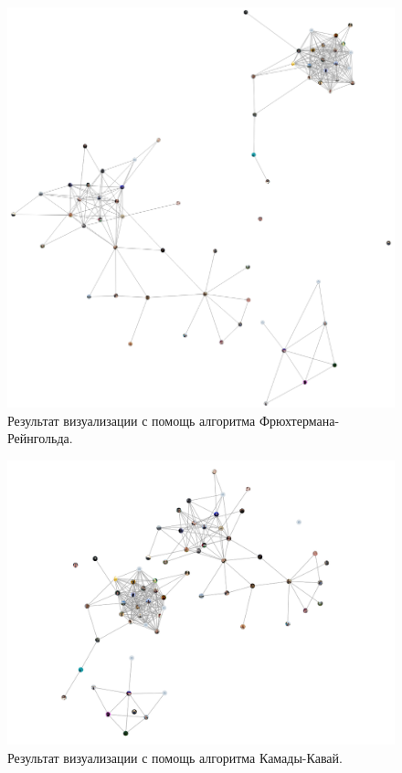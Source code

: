 \documentclass[14pt, russian]{scrartcl}
\begin{document}
\begin{figure}[H]
\centering
  \begin{minipage}[t]{.7\textwidth}
  \centering
\includegraphics[width=.7\textwidth]{./imgs/fr.png}
  \end{minipage}
\caption{Результат визуализации с помощь алгоритма Фрюхтермана-Рейнгольда.}
\label{fig:fr_result}
\end{figure}


\begin{figure}[H]
\centering
  \begin{minipage}[t]{.9\textwidth}
  \centering
\includegraphics[width=.9\textwidth]{./imgs/kk.png}
  \end{minipage}
\caption{Результат визуализации с помощь алгоритма Камады-Кавай.}
\label{fig:kk_result}
\end{figure}
\end{document}
